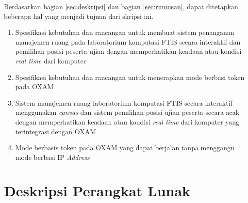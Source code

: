 \documentclass[a4paper,twoside]{article}
\begin{document}
Berdasarkan bagian \ref{sec:deskripsi} dan bagian \ref{sec:rumusan}, dapat ditetapkan beberapa hal yang menjadi tujuan dari skripsi ini.

\begin{enumerate}
    \item Spesifikasi kebutuhan dan rancangan untuk membuat sistem penanganan manajemen ruang pada laboratorium komputasi FTIS secara interaktif dan pemilihan posisi peserta ujian dengan memperhatikan keadaan atau kondisi \textit{real time} dari komputer
    \item Spesifikasi kebutuhan  dan rancangan untuk menerapkan mode berbasi token pada OXAM
    \item Sistem manajemen ruang laboratorium komputasi FTIS secara interaktif menggunakan \textit{canvas} dan sistem pemilihan posisi ujian peserta secara acak dengan memperhatikan keadaan atau kondisi \textit{real time} dari komputer yang terintegrasi dengan OXAM
    \item Mode berbasis token pada OXAM yang dapat berjalan tanpa menggangu mode berbasi IP \textit{Address}
\end{enumerate}

\section{Deskripsi Perangkat Lunak}
\end{document}
